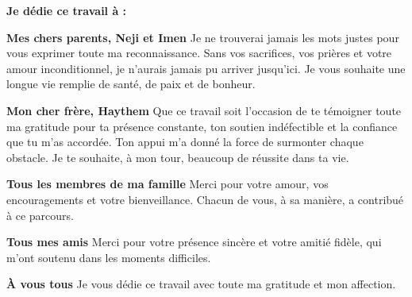 \textbf{Je dédie ce travail à :}

\medskip

\textbf{Mes chers parents, Neji et Imen}
Je ne trouverai jamais les mots justes pour vous exprimer toute ma reconnaissance. Sans vos sacrifices, vos prières et votre amour inconditionnel, je n’aurais jamais pu arriver jusqu’ici. Je vous souhaite une longue vie remplie de santé, de paix et de bonheur.

\medskip

\textbf{Mon cher frère, Haythem}
Que ce travail soit l’occasion de te témoigner toute ma gratitude pour ta présence constante, ton soutien indéfectible et la confiance que tu m’as accordée. Ton appui m’a donné la force de surmonter chaque obstacle. Je te souhaite, à mon tour, beaucoup de réussite dans ta vie.

\medskip

\textbf{Tous les membres de ma famille}
Merci pour votre amour, vos encouragements et votre bienveillance. Chacun de vous, à sa manière, a contribué à ce parcours.

\medskip

\textbf{Tous mes amis}
Merci pour votre présence sincère et votre amitié fidèle, qui m’ont soutenu dans les moments difficiles.

\medskip

\textbf{À vous tous}
Je vous dédie ce travail avec toute ma gratitude et mon affection.